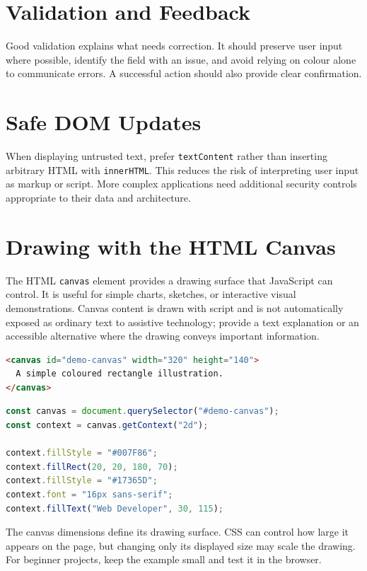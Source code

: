 \documentclass[11pt,openany,oneside]{book}
\begin{document}
\section{Validation and Feedback}
Good validation explains what needs correction. It should preserve user input where possible, identify the field with an issue, and avoid relying on colour alone to communicate errors. A successful action should also provide clear confirmation.

\section{Safe DOM Updates}
When displaying untrusted text, prefer \texttt{textContent} rather than inserting arbitrary HTML with \texttt{innerHTML}. This reduces the risk of interpreting user input as markup or script. More complex applications need additional security controls appropriate to their data and architecture.


\section{Drawing with the HTML Canvas}
The HTML \texttt{canvas} element provides a drawing surface that JavaScript can control. It is useful for simple charts, sketches, or interactive visual demonstrations. Canvas content is drawn with script and is not automatically exposed as ordinary text to assistive technology; provide a text explanation or an accessible alternative where the drawing conveys important information.

\begin{lstlisting}[style=webcode,language=HTML]
<canvas id="demo-canvas" width="320" height="140">
  A simple coloured rectangle illustration.
</canvas>
\end{lstlisting}

\begin{lstlisting}[style=webcode,language=JavaScript]
const canvas = document.querySelector("#demo-canvas");
const context = canvas.getContext("2d");

context.fillStyle = "#007F86";
context.fillRect(20, 20, 180, 70);
context.fillStyle = "#17365D";
context.font = "16px sans-serif";
context.fillText("Web Developer", 30, 115);
\end{lstlisting}
The canvas dimensions define its drawing surface. CSS can control how large it appears on the page, but changing only its displayed size may scale the drawing. For beginner projects, keep the example small and test it in the browser.
\end{document}
